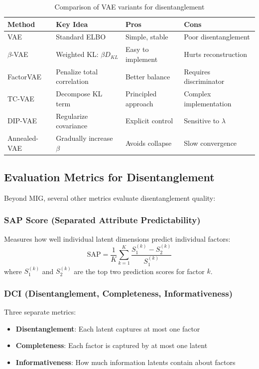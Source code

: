 \documentclass[conference]{IEEEtran}
\begin{document}
\begin{table}[H]
\centering
\small
\begin{tabular}{@{}p{2cm}p{3.5cm}p{3cm}p{3.5cm}@{}}
\toprule
\textbf{Method} & \textbf{Key Idea} & \textbf{Pros} & \textbf{Cons} \\ \midrule
VAE & Standard ELBO & Simple, stable & Poor disentanglement \\
$\beta$-VAE & Weighted KL: $\beta D_{KL}$ & Easy to implement & Hurts reconstruction \\
FactorVAE & Penalize total correlation & Better balance & Requires discriminator \\
TC-VAE & Decompose KL term & Principled approach & Complex implementation \\
DIP-VAE & Regularize covariance & Explicit control & Sensitive to $\lambda$ \\
Annealed-VAE & Gradually increase $\beta$ & Avoids collapse & Slow convergence \\ \bottomrule
\end{tabular}
\caption{Comparison of VAE variants for disentanglement}
\label{tab:vae_variants}
\end{table}

\subsection{Evaluation Metrics for Disentanglement}

Beyond MIG, several other metrics evaluate disentanglement quality:

\subsubsection{SAP Score (Separated Attribute Predictability)}

Measures how well individual latent dimensions predict individual factors:
\begin{equation}
\text{SAP} = \frac{1}{K} \sum_{k=1}^{K} \frac{S_1^{(k)} - S_2^{(k)}}{S_1^{(k)}}
\end{equation}
where $S_1^{(k)}$ and $S_2^{(k)}$ are the top two prediction scores for factor $k$.

\subsubsection{DCI (Disentanglement, Completeness, Informativeness)}

Three separate metrics:
\begin{itemize}
    \item \textbf{Disentanglement}: Each latent captures at most one factor
    \item \textbf{Completeness}: Each factor is captured by at most one latent
    \item \textbf{Informativeness}: How much information latents contain about factors
\end{itemize}
\end{document}
